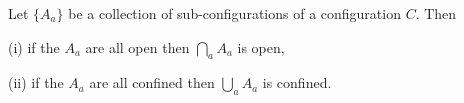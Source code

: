 Let $\{A_a\}$ be a collection of sub-configurations of a configuration $C$. Then

(i) if the $A_a$ are all open then $\bigcap_a A_a$ is open,

(ii) if the $A_a$ are all confined then $\bigcup_a A_a$ is confined.
